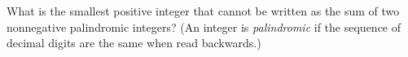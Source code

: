 What is the smallest positive integer that cannot be written as the sum of two nonnegative palindromic integers? (An integer is \textit{palindromic} if the sequence of decimal digits are the same when read backwards.)